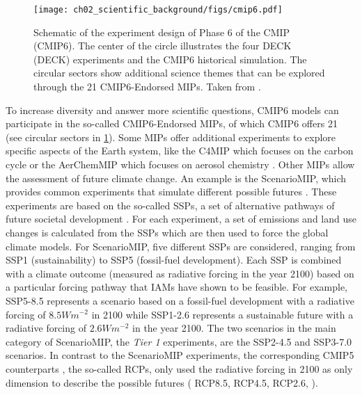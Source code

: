 \begin{figure}[t]
  \centering
  \texttt{[image: 
    ch02\_scientific\_background/figs/cmip6.pdf]}
  \caption{Schematic of the experiment design of Phase 6 of the \acl{CMIP}
    (\acs{CMIP}6). The center of the circle illustrates the four \acs{DECK}
    (\acl{DECK}) experiments and the \acs{CMIP}6 historical simulation. The
    circular sectors show additional science themes that can be explored
    through the 21 \acs{CMIP}6-Endorsed \acfp{MIP}. Taken from
    \textcite{Simpkins2017}.}
  \label{fig:02:cmip6}
\end{figure}

To increase diversity and answer more scientific questions, \acs{CMIP}6 models
can participate in the so-called \acs{CMIP}6-Endorsed \acp{MIP}, of which
\acs{CMIP}6 offers 21 (see circular sectors in \cref{fig:02:cmip6}). Some
\acp{MIP} offer additional experiments to explore specific aspects of the Earth
system, like the \ac{C4MIP} which focuses on the carbon cycle
\autocite{Jones2016} or the \ac{AerChemMIP} which focuses on aerosol chemistry
\autocite{Collins2017}. Other \acp{MIP} allow the assessment of future climate
change. An example is the \ac{ScenarioMIP}, which provides common experiments
that simulate different possible futures \autocite{ONeill2016}. These
experiments are based on the so-called \acp{SSP}, a set of alternative pathways
of future societal development \autocite{ONeill2013, ONeill2017}. For each
experiment, a set of emissions and land use changes is calculated from the
\acp{SSP} \autocite{Riahi2017} which are then used to force the global climate
models. For \ac{ScenarioMIP}, five different \acp{SSP} are considered, ranging
from \ac{SSP}1 (sustainability) to \ac{SSP}5 (fossil-fuel development). Each
\ac{SSP} is combined with a climate outcome (measured as radiative forcing in
the year 2100) based on a particular forcing pathway that \acp{IAM} have shown
to be feasible. For example, \ac{SSP}5-8.5 represents a scenario based on a
fossil-fuel development with a radiative forcing of $8.5 \unit{W m^{-2}}$ in
2100 while \ac{SSP}1-2.6 represents a sustainable future with a radiative
forcing of $2.6 \unit{W m^{-2}}$ in the year 2100. The two scenarios in the
main category of \ac{ScenarioMIP}, the \emph{Tier 1} experiments, are the
\ac{SSP}2-4.5 and \ac{SSP}3-7.0 scenarios. In contrast to the \ac{ScenarioMIP}
experiments, the corresponding \acs{CMIP}5 counterparts \autocite{Taylor2012},
the so-called \acp{RCP}, only used the radiative forcing in 2100 as only
dimension to describe the possible futures (\eg{} \ac{RCP}8.5, \ac{RCP}4.5,
\ac{RCP}2.6, \etc{}).

